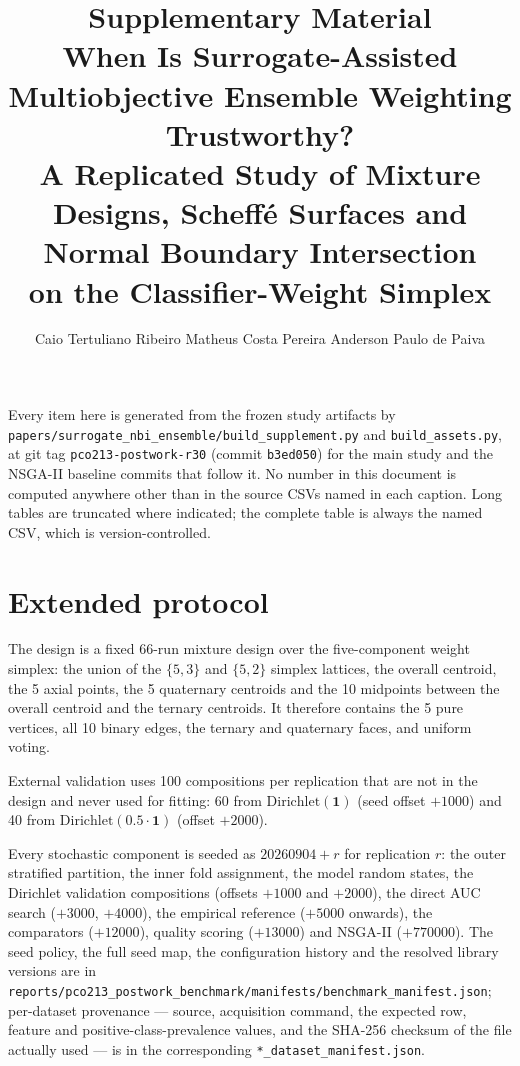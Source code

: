 \documentclass[11pt,a4paper]{article}
\title{\bfseries Supplementary Material\\[0.4em]
\large When Is Surrogate-Assisted Multiobjective Ensemble Weighting Trustworthy?\\
A Replicated Study of Mixture Designs, Scheff\'e Surfaces and Normal Boundary Intersection\\
on the Classifier-Weight Simplex}
\author{Caio Tertuliano Ribeiro \quad Matheus Costa Pereira \quad Anderson Paulo de Paiva}
\date{}
\begin{document}
\maketitle

\noindent
Every item here is generated from the frozen study artifacts by
\texttt{papers/\allowbreak surrogate\_nbi\_ensemble/\allowbreak build\_supplement.py} and
\texttt{build\_assets.py}, at git tag \texttt{pco213-postwork-r30} (commit \texttt{b3ed050}) for the main study and the
NSGA-II baseline commits that follow it. No number in this document is computed anywhere other than in the source
CSVs named in each caption. Long tables are truncated where indicated; the complete table is always the named CSV,
which is version-controlled.

\tableofcontents
\newpage

\section{Extended protocol}
\label{sec:s1}

The design is a fixed 66-run mixture design over the five-component weight simplex: the union of the $\{5,3\}$ and
$\{5,2\}$ simplex lattices, the overall centroid, the 5 axial points, the 5 quaternary centroids and the 10 midpoints
between the overall centroid and the ternary centroids. It therefore contains the 5 pure vertices, all 10 binary
edges, the ternary and quaternary faces, and uniform voting.

External validation uses 100 compositions per replication that are not in the design and never used for fitting:
60 from $\mathrm{Dirichlet}(\mathbf{1})$ (seed offset $+1000$) and 40 from $\mathrm{Dirichlet}(0.5\cdot\mathbf{1})$
(offset $+2000$).

Every stochastic component is seeded as $20260904 + r$ for replication $r$: the outer stratified partition, the
inner fold assignment, the model random states, the Dirichlet validation compositions (offsets $+1000$ and $+2000$),
the direct AUC search ($+3000$, $+4000$), the empirical reference ($+5000$ onwards), the comparators ($+12000$),
quality scoring ($+13000$) and NSGA-II ($+770000$). The seed policy, the full seed map, the configuration history and the resolved library
versions are in \texttt{reports/\allowbreak pco213\_postwork\_benchmark/\allowbreak manifests/\allowbreak benchmark\_manifest.json}; per-dataset
provenance --- source, acquisition command, the expected row, feature and positive-class-prevalence values, and the
SHA-256 checksum of the file actually used --- is in the corresponding
\texttt{*\_dataset\_manifest.json}.
\end{document}
